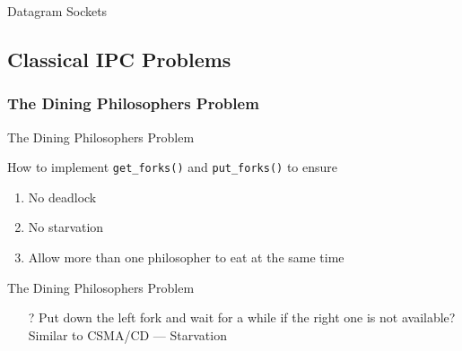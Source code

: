 \begin{frame}{Datagram Sockets}
\begin{center}
\end{center}
\end{frame}

\subsection{Classical IPC Problems}
\label{sec:class-ipc-probl}

\subsubsection{The Dining Philosophers Problem}
\label{sec:dining-phil-probl}

\begin{frame}{The Dining Philosophers Problem}
  \begin{center}
    \begin{minipage}{.49\linewidth}
    \end{minipage} \hfill
    \begin{minipage}{.49\linewidth}
    \end{minipage}
  \end{center}
  
  How to implement \texttt{get\_forks()} and \texttt{put\_forks()} to ensure
  \begin{enumerate}
  \item No deadlock
  \item No starvation
  \item Allow more than one philosopher to eat at the same time
  \end{enumerate}
\end{frame}

\begin{frame}{The Dining Philosophers Problem}%
  \begin{center}
  \end{center}\pause
  \begin{itemize}
  \item[?] Put down the left fork and wait for a while if the right one is not available?
    Similar to CSMA/CD\pause{} --- \alert{Starvation}
  \end{itemize}
\end{frame}

